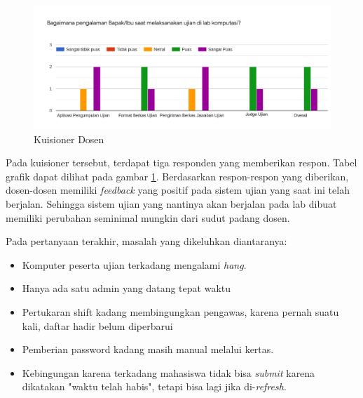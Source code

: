     \begin{figure}
        \centering
        \includegraphics[width=0.6\paperwidth]{Gambar/survey-dosen.pdf}
        \caption{Kuisioner Dosen}
        \label{fig:kuisioner-dosen}
    \end{figure}
    
    Pada kuisioner tersebut, terdapat tiga responden yang memberikan respon. Tabel grafik dapat dilihat pada gambar \ref{fig:kuisioner-dosen}. Berdasarkan respon-respon yang diberikan, dosen-dosen memiliki \textit{feedback} yang positif pada sistem ujian yang saat ini telah berjalan. Sehingga sistem ujian yang nantinya akan berjalan pada lab dibuat memiliki perubahan seminimal mungkin dari sudut padang dosen.
    
    Pada pertanyaan terakhir, masalah yang dikeluhkan diantaranya:
    \begin{itemize}
        \item Komputer peserta ujian terkadang mengalami \textit{hang}.
        
        \item Hanya ada satu admin yang datang tepat waktu
        
        \item Pertukaran shift kadang membingungkan pengawas, karena pernah suatu kali, daftar hadir belum diperbarui
        
        \item Pemberian password kadang masih manual melalui kertas.
        
        \item Kebingungan karena terkadang mahasiswa tidak bisa \textit{submit} karena dikatakan "waktu telah habis", tetapi bisa lagi jika di-\textit{refresh}.
    \end{itemize}

    
